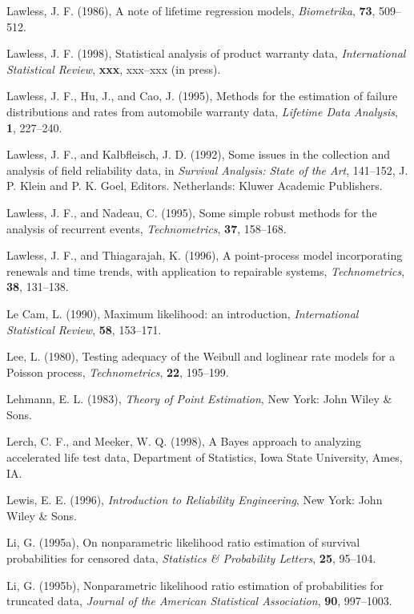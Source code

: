 \begin{thebibliography}{999}
Lawless, J. F. (1986), A note of lifetime regression models, {\em
Biometrika}, {\bf 73}, 509--512.

Lawless, J. F. (1998), Statistical analysis of product warranty
data, {\em International Statistical Review}, {\bf xxx}, xxx--xxx (in
press).

Lawless, J. F., Hu, J., and Cao, J. (1995), Methods for the
estimation of failure distributions and rates from automobile
warranty data, {\em Lifetime Data Analysis}, {\bf 1}, 227--240.

Lawless, J. F., and Kalbfleisch, J. D. (1992), Some issues in the
collection and analysis of field reliability data, in {\em Survival
Analysis: State of the Art}, 141--152, J. P. Klein and P. K. Goel,
Editors. Netherlands: Kluwer Academic Publishers.

Lawless, J. F., and Nadeau, C. (1995), Some simple robust methods for
the analysis of recurrent events, {\em Technometrics}, {\bf 37},
158--168.

Lawless, J. F., and Thiagarajah, K. (1996), A point-process
model incorporating renewals and time trends, with
application to repairable systems, {\em
Technometrics}, {\bf 38}, 131--138.

Le Cam, L. (1990), Maximum likelihood: an introduction, {\em
International Statistical Review}, {\bf 58}, 153--171.

Lee, L.  (1980), Testing adequacy of the Weibull and loglinear rate 
models for a Poisson process, {\em
Technometrics}, {\bf 22}, 195--199.

Lehmann, E. L. (1983), {\em Theory of Point Estimation}, New York:
John Wiley \& Sons.

Lerch, C. F., and Meeker, W. Q. (1998), A Bayes approach to analyzing
accelerated life test data, Department of Statistics, Iowa State
University, Ames,  IA.

Lewis, E. E. (1996), {\em Introduction to Reliability Engineering},
New York: John Wiley \& Sons.

Li, G. (1995a), On nonparametric likelihood ratio estimation of
survival probabilities for censored data, {\em Statistics \&
Probability Letters}, {\bf 25}, 95--104.

Li, G. (1995b), Nonparametric likelihood ratio estimation of
probabilities for truncated data, {\em Journal of the American
Statistical Association}, {\bf 90}, 997--1003.


\end{thebibliography}
